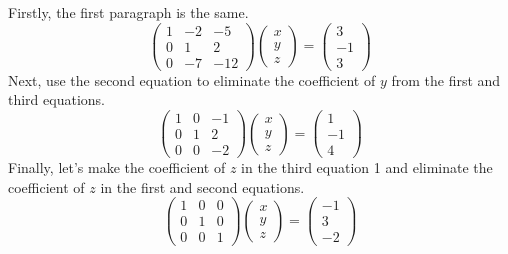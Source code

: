 \documentclass{ltjsbook}
\begin{document}
Firstly, the first paragraph is the same.
\[
	\begin{pmatrix} 1 & -2 & -5  \\
                0 & 1  & 2   \\
                0 & -7 & -12\end{pmatrix}
	\begin{pmatrix} x \\ y \\ z \end{pmatrix}
	=
	\begin{pmatrix} 3 \\ -1 \\ 3 \end{pmatrix}
\]
Next, use the second equation to eliminate the coefficient of $y$ from the first and third equations.
\[
	\begin{pmatrix} 1 & 0 & -1 \\
                0 & 1 & 2  \\
                0 & 0 & -2\end{pmatrix}
	\begin{pmatrix} x \\ y \\ z \end{pmatrix}
	=
	\begin{pmatrix} 1 \\ -1 \\ 4 \end{pmatrix}
\]
Finally, let's make the coefficient of $z$ in the third equation 1 and eliminate the coefficient of $z$ in the first and second equations.
\[
	\begin{pmatrix} 1 & 0 & 0 \\
                0 & 1 & 0 \\
                0 & 0 & 1\end{pmatrix}
	\begin{pmatrix} x \\ y \\ z \end{pmatrix}
	=
	\begin{pmatrix} -1 \\ 3 \\ -2 \end{pmatrix}
\]
\end{document}
